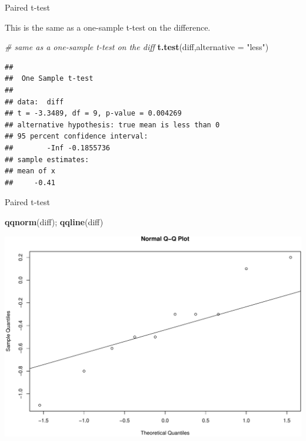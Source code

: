 \documentclass[9pt,ignorenonframetext,]{beamer}
\newenvironment{Shaded}{\begin{snugshade}}{\end{snugshade}}
\newcommand{\KeywordTok}[1]{\textcolor[rgb]{0.13,0.29,0.53}{\textbf{{#1}}}}
\newcommand{\DataTypeTok}[1]{\textcolor[rgb]{0.13,0.29,0.53}{{#1}}}
\newcommand{\StringTok}[1]{\textcolor[rgb]{0.31,0.60,0.02}{{#1}}}
\newcommand{\CommentTok}[1]{\textcolor[rgb]{0.56,0.35,0.01}{\textit{{#1}}}}
\newcommand{\NormalTok}[1]{{#1}}
\begin{document}
\begin{frame}[fragile]{Paired t-test}

This is the same as a one-sample t-test on the difference.

\begin{Shaded}
\begin{Highlighting}[]
\CommentTok{# same as a one-sample t-test on the diff}
\KeywordTok{t.test}\NormalTok{(diff,}\DataTypeTok{alternative =} \StringTok{"less"}\NormalTok{) }
\end{Highlighting}
\end{Shaded}

\begin{verbatim}
## 
##  One Sample t-test
## 
## data:  diff
## t = -3.3489, df = 9, p-value = 0.004269
## alternative hypothesis: true mean is less than 0
## 95 percent confidence interval:
##        -Inf -0.1855736
## sample estimates:
## mean of x 
##     -0.41
\end{verbatim}

\end{frame}

\begin{frame}[fragile]{Paired t-test}

\begin{Shaded}
\begin{Highlighting}[]
\KeywordTok{qqnorm}\NormalTok{(diff); }\KeywordTok{qqline}\NormalTok{(diff)}
\end{Highlighting}
\end{Shaded}

\includegraphics{class4slides-jan18_files/figure-beamer/unnamed-chunk-26-1.pdf}

\end{frame}
\end{document}
